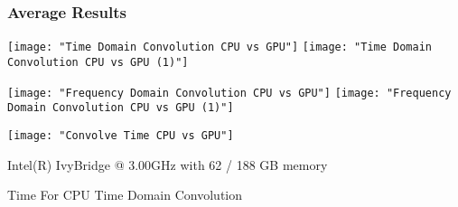 \subsubsection{Average Results}
    \texttt{[image: "Time Domain Convolution CPU vs GPU"]}
    \texttt{[image: "Time Domain Convolution CPU vs GPU (1)"]}
    
    \texttt{[image: "Frequency Domain Convolution CPU vs GPU"]}
    \texttt{[image: "Frequency Domain Convolution CPU vs GPU (1)"]}
    
    \texttt{[image: "Convolve Time CPU vs GPU"]}
\begin{center}
    Intel(R) IvyBridge @ 3.00GHz with 62 / 188 GB memory
    
    Time For CPU Time Domain Convolution
    

\end{center}
